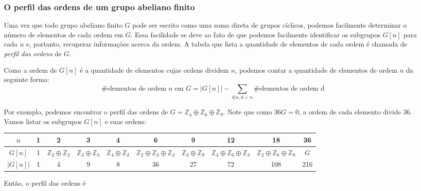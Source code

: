     	\subsubsection{O perfil das ordens de um grupo abeliano finito}
    	Uma vez que todo grupo abeliano finito $G$ pode ser escrito como uma soma direta de grupos cíclicos,
    	podemos facilmente determinar o número de elementos de cada ordem em $G$. Essa facilidade se deve ao 
    	fato de que podemos facilmente identificar os subgrupos $G[n]$ para cada $n$ e, portanto, recuperar
    	informações acerca da ordem. A tabela que lista a quantidade de elementos de cada ordem é chamada de
    	\textit{perfil das ordens} de $G$.
    	
    	\par\vspace{0.3cm} Como a ordem de $G[n]$ é a quantidade de elementos cujas ordens dividem $n$, 
    	podemos contar a quantidade de elementos de ordem $n$ da seguinte forma:
    	\begin{equation*}
    	    \#\text{elementos de ordem $n$ em $G$} = |G[n]| - \sum_{d|n, d<n}\#\text{elementos de ordem d}
    	\end{equation*}
    	\par\vspace{0.3cm} Por exemplo, podemos encontrar o perfil das ordens de 
    	$G = \mathbb{Z}_4\oplus\mathbb{Z}_6\oplus\mathbb{Z}_9$. Note que como $36G = 0$, a ordem de cada 
    	elemento divide $36$. Vamos listar os subgrupos $G[n]$ e suas ordens:
    	\begin{center}
    		\begin{tabular}{|c|c|c|c|c|c|c|c|c|c|}
    		\hline
    		$n$ & 1 & 2 & 3 & 4 & 6 & 9 & 12 & 18 & 36 \\
    		\hline 
    		$G[n]$ & 1 & $\mathbb{Z}_2\oplus\mathbb{Z}_2$ & $\mathbb{Z}_3\oplus\mathbb{Z}_3$ &
    		$\mathbb{Z}_4\oplus\mathbb{Z}_2$ & $\mathbb{Z}_2\oplus\mathbb{Z}_3\oplus\mathbb{Z}_3$ &
    		$\mathbb{Z}_3\oplus\mathbb{Z}_9$ & $\mathbb{Z}_4\oplus\mathbb{Z}_6\oplus\mathbb{Z}_3$ &
    		$\mathbb{Z}_2\oplus\mathbb{Z}_6\oplus\mathbb{Z}_9$ & $G$ \\
    		\hline 
    		$|G[n]|$ & 1 & 4 & 9 & 8 & 36 & 27 & 72 & 108 & 216 \\
    		\hline
    		\end{tabular}
    	\end{center}
    	\par\vspace{0.3cm} Então, o perfil das ordens é
